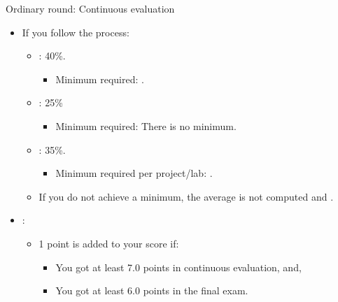 \begin{frame}[t]{Ordinary round: Continuous evaluation}
\begin{itemize}
  \item If you follow the  process:
    \begin{itemize}
      \item {}: 40\%.
        \begin{itemize}
          \item Minimum required: .
        \end{itemize}
      \item {}: 25\%
        \begin{itemize}
          \item Minimum required: There is no minimum.
        \end{itemize}
      \item {}: 35\%.
        \begin{itemize}
          \item Minimum required per project/lab: .
        \end{itemize}
      \item If you do not achieve a minimum, the average is not computed and 
          .
    \end{itemize}

  \item {}:
    \begin{itemize}
      \item 1 point is added to your score if:
        \begin{itemize}
          \item You got at least 7.0 points in continuous evaluation, and,
          \item You got at least 6.0 points in the final exam.
        \end{itemize}
    \end{itemize}
\end{itemize}
\end{frame}

